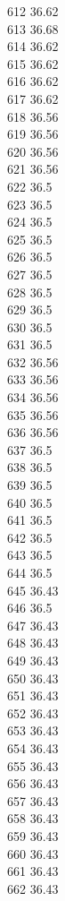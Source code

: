 612	36.62\\
613	36.68\\
614	36.62\\
615	36.62\\
616	36.62\\
617	36.62\\
618	36.56\\
619	36.56\\
620	36.56\\
621	36.56\\
622	36.5\\
623	36.5\\
624	36.5\\
625	36.5\\
626	36.5\\
627	36.5\\
628	36.5\\
629	36.5\\
630	36.5\\
631	36.5\\
632	36.56\\
633	36.56\\
634	36.56\\
635	36.56\\
636	36.56\\
637	36.5\\
638	36.5\\
639	36.5\\
640	36.5\\
641	36.5\\
642	36.5\\
643	36.5\\
644	36.5\\
645	36.43\\
646	36.5\\
647	36.43\\
648	36.43\\
649	36.43\\
650	36.43\\
651	36.43\\
652	36.43\\
653	36.43\\
654	36.43\\
655	36.43\\
656	36.43\\
657	36.43\\
658	36.43\\
659	36.43\\
660	36.43\\
661	36.43\\
662	36.43\\
